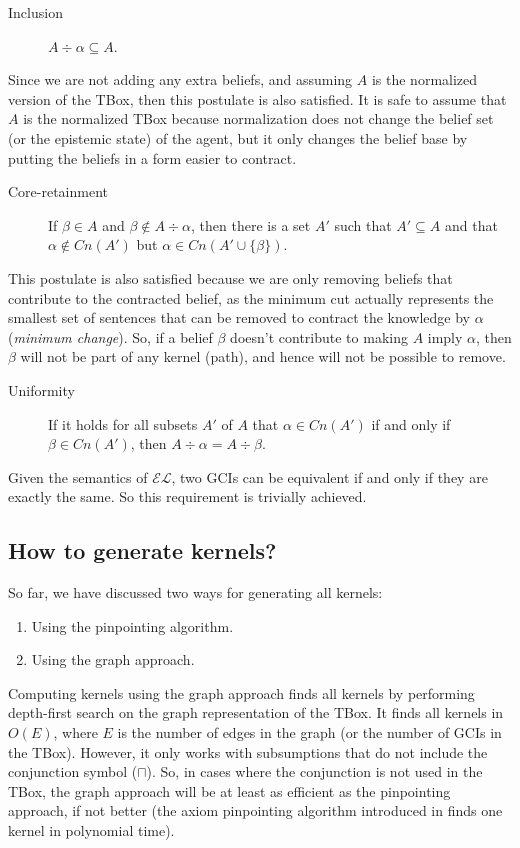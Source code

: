 \begin{description}
\item[Inclusion] $A \div \alpha \subseteq A$.
\end{description}
Since we are not adding any extra beliefs, and assuming $A$ is the normalized version of the TBox, then this postulate is also satisfied. It is safe to assume that $A$ is the normalized TBox because normalization does not change the belief set (or the epistemic state) of the agent, but it only changes the belief base by putting the beliefs in a form easier to contract.

\begin{description}
\item[Core-retainment] If $\beta \in A$ and $\beta \notin A \div \alpha$, then there is a set $A'$ such that $A' \subseteq A$ and that $\alpha \notin Cn(A')$ but $\alpha \in Cn(A' \cup \{ \beta \})$.
\end{description}
This postulate is also satisfied because we are only removing beliefs that contribute to the contracted belief, as the minimum cut actually represents the smallest set of sentences that can be removed to contract the knowledge by $\alpha$ (\textit{minimum change}). So, if a belief $\beta$ doesn't contribute to making $A$ imply $\alpha$, then $\beta$ will not be part of any kernel (path), and hence will not be possible to remove.

\begin{description}
\item[Uniformity] If it holds for all subsets $A'$ of $A$ that $\alpha \in Cn(A')$ if and only if $\beta \in Cn(A')$, then $A \div \alpha = A \div \beta$.
\end{description}
Given the semantics of $\mathcal{EL}$, two GCIs can be equivalent if and only if they are exactly the same. So this requirement is trivially achieved.


\subsection{How to generate kernels?}
So far, we have discussed two ways for generating all kernels:
\begin{enumerate}
\item Using the pinpointing algorithm.
\item Using the graph approach.
\end{enumerate}
Computing kernels using the graph approach finds all kernels by performing depth-first search on the graph representation of the TBox. It finds all kernels in $O(E)$, where $E$ is the number of edges in the graph (or the number of GCIs in the TBox). However, it only works with subsumptions that do not include the conjunction symbol ($\sqcap$). So, in cases where the conjunction is not used in the TBox, the graph approach will be at least as efficient as the pinpointing approach, if not better (the axiom pinpointing algorithm introduced in \cite{pin} finds one kernel in polynomial time).


